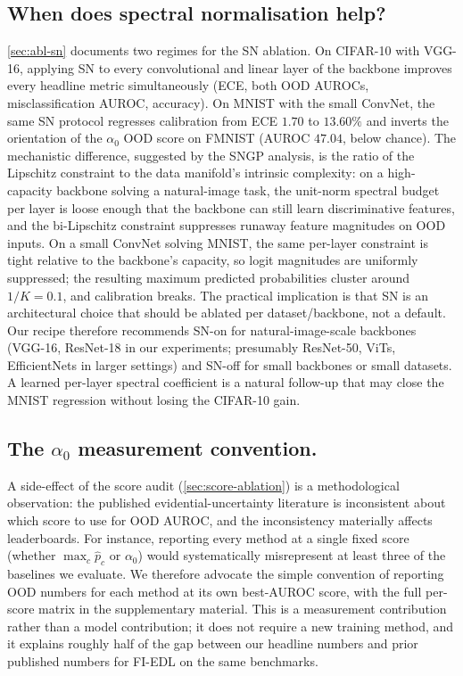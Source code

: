 \documentclass[review,5p,times]{elsarticle}
\begin{document}
\subsection{When does spectral normalisation help?}\label{sec:disc-sn}
\autoref{sec:abl-sn} documents two regimes for the SN ablation. On
CIFAR-10 with VGG-16, applying SN to every convolutional and linear
layer of the backbone improves every headline metric simultaneously
(ECE, both OOD AUROCs, misclassification AUROC, accuracy). On MNIST
with the small ConvNet, the same SN protocol regresses calibration
from ECE $1.70$ to $13.60\%$ and inverts the orientation of the
$\alpha_0$ OOD score on FMNIST (AUROC $47.04$, below chance). The
mechanistic difference, suggested by the SNGP analysis, is the ratio of
the Lipschitz constraint to the data manifold's intrinsic complexity:
on a high-capacity backbone solving a natural-image task, the unit-norm
spectral budget per layer is loose enough that the backbone can still
learn discriminative features, and the bi-Lipschitz constraint suppresses
runaway feature magnitudes on OOD inputs. On a small ConvNet solving
MNIST, the same per-layer constraint is tight relative to the backbone's
capacity, so logit magnitudes are uniformly suppressed; the resulting
maximum predicted probabilities cluster around $1/K\!=\!0.1$, and
calibration breaks. The practical implication is that SN is an
architectural choice that should be ablated per dataset/backbone, not a
default. Our recipe therefore recommends SN-on for natural-image-scale
backbones (VGG-16, ResNet-18 in our experiments; presumably ResNet-50,
ViTs, EfficientNets in larger settings) and SN-off for small backbones
or small datasets. A learned per-layer spectral coefficient is a natural
follow-up that may close the MNIST regression without losing the
CIFAR-10 gain.

\subsection{The $\alpha_0$ measurement convention.}\label{sec:disc-score}
A side-effect of the score audit (\autoref{sec:score-ablation}) is a
methodological observation: the published evidential-uncertainty
literature is inconsistent about which score to use for OOD AUROC, and
the inconsistency materially affects leaderboards. For instance,
reporting every method at a single fixed score (whether $\max_c\hat p_c$
or $\alpha_0$) would systematically misrepresent at least three of the
baselines we evaluate. We therefore advocate the simple convention of
reporting OOD numbers for each method at its own best-AUROC score, with
the full per-score matrix in the supplementary material. This is a
measurement contribution rather than a model contribution; it does not
require a new training method, and it explains roughly half of the gap
between our headline numbers and prior published numbers for FI-EDL on
the same benchmarks.
\end{document}

